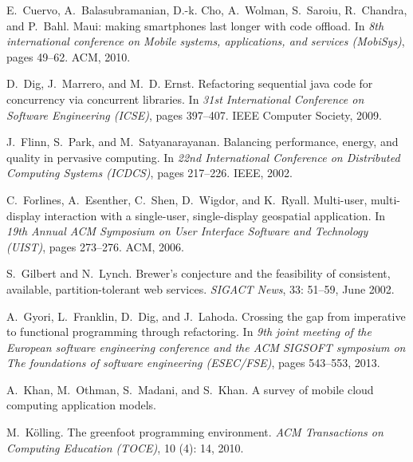 \documentclass[article]{sigplanconf}
\begin{document}
\begin{thebibliography}{10}
E.~Cuervo, A.~Balasubramanian, D.-k. Cho, A.~Wolman, S.~Saroiu, R.~Chandra, and
  P.~Bahl.
\newblock Maui: making smartphones last longer with code offload.
\newblock In \emph{8th international conference on Mobile systems,
  applications, and services (MobiSys)}, pages 49--62. ACM, 2010.

D.~Dig, J.~Marrero, and M.~D. Ernst.
\newblock Refactoring sequential java code for concurrency via concurrent
  libraries.
\newblock In \emph{31st International Conference on Software Engineering
  (ICSE)}, pages 397--407. IEEE Computer Society, 2009.

J.~Flinn, S.~Park, and M.~Satyanarayanan.
\newblock Balancing performance, energy, and quality in pervasive computing.
\newblock In \emph{22nd International Conference on Distributed Computing
  Systems (ICDCS)}, pages 217--226. IEEE, 2002.

C.~Forlines, A.~Esenther, C.~Shen, D.~Wigdor, and K.~Ryall.
\newblock Multi-user, multi-display interaction with a single-user,
  single-display geospatial application.
\newblock In \emph{19th Annual ACM Symposium on User Interface Software and
  Technology (UIST)}, pages 273--276. ACM, 2006.

S.~Gilbert and N.~Lynch.
\newblock Brewer's conjecture and the feasibility of consistent, available,
  partition-tolerant web services.
\newblock \emph{SIGACT News}, 33: 51--59, June 2002.

A.~Gyori, L.~Franklin, D.~Dig, and J.~Lahoda.
\newblock Crossing the gap from imperative to functional programming through
  refactoring.
\newblock In \emph{9th joint meeting of the European software engineering
  conference and the ACM SIGSOFT symposium on The foundations of software
  engineering (ESEC/FSE)}, pages 543--553, 2013.

A.~Khan, M.~Othman, S.~Madani, and S.~Khan.
\newblock A survey of mobile cloud computing application models.

M.~K{\"o}lling.
\newblock The greenfoot programming environment.
\newblock \emph{ACM Transactions on Computing Education (TOCE)}, 10
  (4): 14, 2010.


\end{thebibliography}
\end{document}
